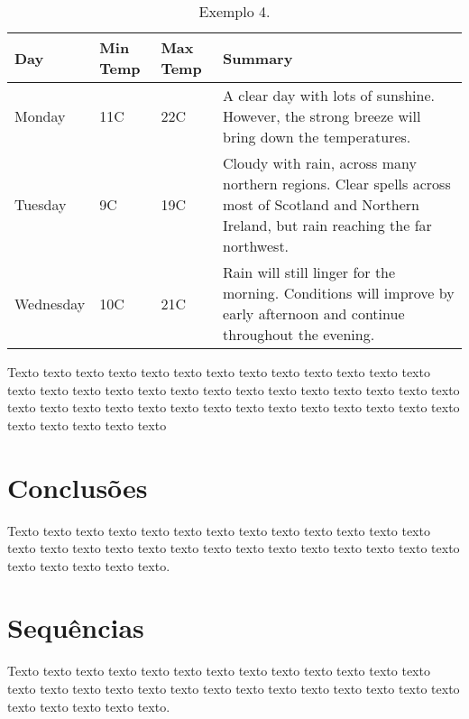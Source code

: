 \documentclass[tcc2]{uftex}
\begin{document}
\begin{table}[!h]
\caption{Exemplo 4.}\label{tab:4}
\begin{center}
    \begin{tabular}{ | l | l | l | p{5cm} |}
    \hline
    Day & Min Temp & Max Temp & Summary \\ \hline
    Monday & 11C & 22C & A clear day with lots of sunshine.  
    However, the strong breeze will bring down the temperatures. \\ \hline
    Tuesday & 9C & 19C & Cloudy with rain, across many northern regions. Clear spells 
    across most of Scotland and Northern Ireland, 
    but rain reaching the far northwest. \\ \hline
    Wednesday & 10C & 21C & Rain will still linger for the morning. 
    Conditions will improve by early afternoon and continue 
    throughout the evening. \\
    \hline
    \end{tabular}
\end{center}
\end{table}

Texto texto texto texto texto texto texto texto texto texto texto texto texto
texto texto texto texto texto texto texto texto texto texto texto texto texto
texto texto texto texto texto texto texto texto texto texto texto texto texto
texto texto texto texto texto texto texto
\chapter{Conclusões}
\label{cap:conclusoes}

\noindent Texto texto texto texto texto texto texto texto texto texto texto texto texto
texto texto texto texto texto texto texto texto texto texto texto texto texto
texto texto texto texto texto texto.


\backmatter 
\singlespacing   



\appendix
\onehalfspacing

\chapter{Sequências}
\label{ape:sequencias}

\noindent Texto texto texto texto texto texto texto texto texto texto texto texto texto
texto texto texto texto texto texto texto texto texto texto texto texto texto
texto texto texto texto texto texto.
\end{document}
